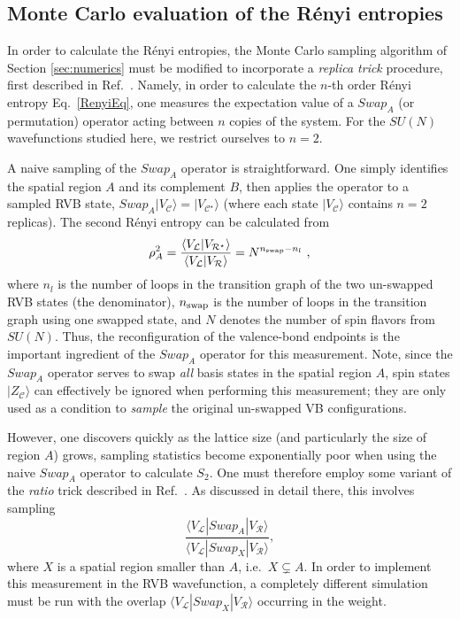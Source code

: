 \documentclass[11pt]{iopart}
\begin{document}
\subsection{Monte Carlo evaluation of the R\'enyi entropies}
\label{sec:su2_numerics}

In order to calculate the R\'enyi entropies, the Monte Carlo sampling algorithm of Section \ref{sec:numerics} must be modified to incorporate
a {\it replica trick} procedure, first described in Ref.~\cite{swap}.  Namely, in order to calculate the $n$-th order R\'enyi entropy Eq.~\ref{RenyiEq}, one measures the expectation value of a $Swap_A$ (or permutation) operator acting between $n$ copies of the system.  For the $SU(N)$ wavefunctions studied here, we restrict ourselves to $n=2$.  

A naive sampling of the $Swap_A$ operator is straightforward.  One simply identifies the spatial region $A$ and its complement $B$, then applies the operator to a sampled RVB state, $Swap_A |V_{\mathcal C} \rangle =  |V_{\mathcal C^{\star}} \rangle$ (where each state $|V_{\mathcal C} \rangle$ contains $n=2$ replicas).  The second Rényi entropy can be calculated from \cite{swap}
\begin{equation}
	\rho_A^2
		= \frac{\langle V_{\mathcal{L}} | V_{\mathcal{R}^{\star}} \rangle}
			{\langle V_{\mathcal{L}} | V_{\mathcal{R}} \rangle} 
			 = N^{n_{\rm swap} - n_l}\ ,
\end{equation}
where $n_l$ is the number of loops in the transition graph of the two un-swapped RVB states (the denominator), $n_{\rm swap}$ is the number of loops in the transition graph using one swapped state, and $N$ denotes the number of spin flavors from $SU(N)$.  
Thus, the reconfiguration of the valence-bond endpoints is the important ingredient of the $Swap_A$ operator for this measurement.  Note, 
since the $Swap_A$ operator serves to swap {\it all} basis states in the spatial region $A$, spin states $|Z_{\mathcal C} \rangle$ can effectively be ignored when performing this measurement; they are only used as a condition to {\it sample} the original un-swapped VB configurations.

However, one discovers quickly as the lattice size (and particularly the size of region $A$) grows, sampling statistics become exponentially poor when using the naive $Swap_A$ operator to calculate $S_2$.  One must therefore employ some variant of the {\it ratio} trick described in  Ref.~\cite{swap}.  As discussed in detail there, this involves sampling 
\begin{equation}
 \frac{\langle V_{\mathcal{L}} | Swap_A | V_{\mathcal{R}} \rangle}
			{\langle V_{\mathcal{L}} | Swap_X | V_{\mathcal{R}} \rangle},
\end{equation}
where $X$ is a spatial region smaller than $A$, i.e.~$X \subsetneq A$.  In order to implement this measurement in the RVB wavefunction, a completely different simulation must be run with the overlap ${\langle V_{\mathcal{L}} | Swap_X | V_{\mathcal{R}} \rangle}$ occurring in the weight.  
\end{document}

